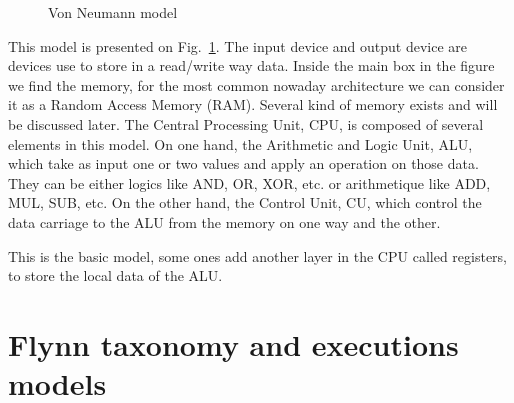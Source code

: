 \begin{figure}
\centering 
{}
\caption{Von Neumann model}
\label{fig:1_HPC:von_neumann_model}
\end{figure}

This model is presented on Fig.~\ref{fig:1_HPC:von_neumann_model}.
The input device and output device are devices use to store in a read/write way data.
Inside the main box in the figure we find the memory, for the most common nowaday architecture we can consider it as a Random Access Memory (RAM). Several kind of memory exists and will be discussed later. 
The Central Processing Unit, CPU, is composed of several elements in this model. 
On one hand, the Arithmetic and Logic Unit, ALU, which take as input one or two values and apply an operation on those data. 
They can be either logics like AND, OR, XOR, etc. or arithmetique like ADD, MUL, SUB, etc.
On the other hand, the Control Unit, CU, which control the data carriage to the ALU from the memory on one way and the other. 

This is the basic model, some ones add another layer in the CPU called registers, to store the local data of the ALU. 

\begin{figure}

\end{figure}

\section{Flynn taxonomy and executions models}

